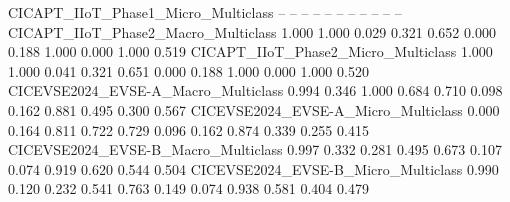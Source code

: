 CICAPT_IIoT_Phase1_Micro_Multiclass                                        --               --                                       --                              --              --                       --                                                        --                                        --                                        --                                 --     --                                        
CICAPT_IIoT_Phase2_Macro_Multiclass                                        1.000            1.000                                    0.029                           0.321           0.652                    0.000                                                     0.188                                     1.000                                     0.000                              1.000   0.519
CICAPT_IIoT_Phase2_Micro_Multiclass                                        1.000            1.000                                    0.041                           0.321           0.651                    0.000                                                     0.188                                     1.000                                     0.000                              1.000   0.520
CICEVSE2024_EVSE-A_Macro_Multiclass                                        0.994            0.346                                    1.000                           0.684           0.710                    0.098                                                     0.162                                     0.881                                     0.495                              0.300   0.567
CICEVSE2024_EVSE-A_Micro_Multiclass                                        0.000            0.164                                    0.811                           0.722           0.729                    0.096                                                     0.162                                     0.874                                     0.339                              0.255   0.415
CICEVSE2024_EVSE-B_Macro_Multiclass                                        0.997            0.332                                    0.281                           0.495           0.673                    0.107                                                     0.074                                     0.919                                     0.620                              0.544   0.504
CICEVSE2024_EVSE-B_Micro_Multiclass                                        0.990            0.120                                    0.232                           0.541           0.763                    0.149                                                     0.074                                     0.938                                     0.581                              0.404   0.479
